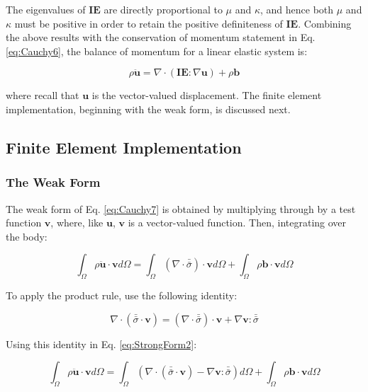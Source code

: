 \documentclass[10pt]{article}
\begin{document}
The eigenvalues of \(\textbf{IE}\) are directly proportional to \(\mu\) and \(\kappa\), and hence both \(\mu\) and \(\kappa\) must be positive in order to retain the positive definiteness of \(\textbf{IE}\). Combining the above results with the conservation of momentum statement in Eq. \eqref{eq:Cauchy6}, the balance of momentum for a linear elastic system is:

\begin{equation}
\label{eq:Cauchy7}
\rho\ddot{\textbf{u}}=\nabla\cdot(\textbf{IE}:\nabla \textbf{u})+\rho\textbf{b}
\end{equation}

where recall that \(\textbf{u}\) is the vector-valued displacement. The finite element implementation, beginning with the weak form, is discussed next.

\subsection{Finite Element Implementation}

\subsubsection{The Weak Form}

The weak form of Eq. \eqref{eq:Cauchy7} is obtained by multiplying through by a test function \(\textbf{v}\), where, like \(\textbf{u}\), \(\textbf{v}\) is a vector-valued function. Then, integrating over the body:

\begin{equation}
\label{eq:StrongForm2}
\int_{\Omega}\rho\ddot{\textbf{u}}\cdot \textbf{v}d\Omega=\int_{\Omega}(\nabla\cdot\bar{\bar{\sigma}})\cdot\textbf{v}d\Omega+\int_{\Omega}\rho\textbf{b}\cdot\textbf{v}d\Omega
\end{equation}

To apply the product rule, use the following identity:

\begin{equation}
\nabla\cdot(\bar{\bar{\sigma}}\cdot\textbf{v})=(\nabla\cdot\bar{\bar{\sigma}})\cdot\textbf{v}+\nabla\textbf{v}:\bar{\bar{\sigma}}
\end{equation}

Using this identity in Eq. \eqref{eq:StrongForm2}:

\begin{equation}
\int_{\Omega}\rho\ddot{\textbf{u}}\cdot \textbf{v}d\Omega=\int_{\Omega}\left(\nabla\cdot(\bar{\bar{\sigma}}\cdot\textbf{v})-\nabla\textbf{v}:\bar{\bar{\sigma}}\right)d\Omega+\int_{\Omega}\rho\textbf{b}\cdot\textbf{v}d\Omega
\end{equation}
\end{document}
